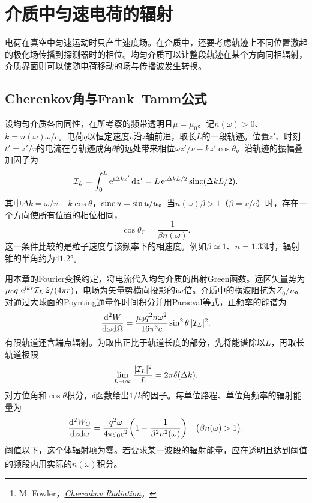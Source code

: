 \section{介质中匀速电荷的辐射}
\label{sec:moving charge in matter}

电荷在真空中匀速运动时只产生速度场。在介质中，还要考虑轨迹上不同位置激起的极化场传播到探测器时的相位。均匀介质可以让整段轨迹在某个方向同相辐射，介质界面则可以使随电荷移动的场与传播波发生转换。

\subsection{Cherenkov角与Frank--Tamm公式}
设均匀介质各向同性，在所考察的频带透明且$\mu = \mu_0$。记$n(\omega) > 0$、$k = n(\omega)\omega/c$。电荷$q$以恒定速度$v$沿$z$轴前进，取长$L$的一段轨迹。位置$z'$、时刻$t' = z'/v$的电流在与轨迹成角$\theta$的远处带来相位$\omega z'/v - kz'\cos\theta$。沿轨迹的振幅叠加因子为
\begin{equation}
    \label{eq:ed-finite-track-interference}
    \mathcal I_L = \int_0^L\mathop{}\!\mathrm{e}^{\mathrm{i}\Delta k z'}\mathop{}\!\mathrm{d} z'
        = L\mathop{}\!\mathrm{e}^{\mathrm{i}\Delta kL/2}\operatorname{sinc}(\Delta kL/2).
\end{equation}
其中$\Delta k = \omega/v - k\cos\theta$，$\operatorname{sinc} u = \sin u/u$。当$n(\omega)\beta > 1$（$\beta = v/c$）时，存在一个方向使所有位置的相位相同，
\begin{equation}
    \cos\theta_\mathrm{C} = \frac{1}{\beta n(\omega)} .
    \label{eqn:Cherenkov angle}
\end{equation}
这一条件比较的是粒子速度与该频率下的相速度。例如$\beta \simeq 1$、$n = 1.33$时，辐射锥的半角约为$\ang{41.2}$。

用本章的Fourier变换约定，将电流代入均匀介质的出射Green函数。远区矢量势为$\mu_0q\,\mathop{}\!\mathrm{e}^{\mathrm{i} kr}\mathcal I_L\mathop{}\!\hat{\bm{z}}/(4\pi r)$，电场为矢量势横向投影的$\mathrm{i}\omega$倍。介质中的横波阻抗为$Z_0/n$。对通过大球面的Poynting通量作时间积分并用Parseval等式，正频率的能谱为
\[
    \frac{\mathop{}\!\mathrm{d}^2W}{\mathrm{d}\omega\mathrm{d}\Omega}
    = \frac{\mu_0 q^2 n\omega^2}{16\pi^3c}
        \sin^2\theta\,\lvert\mathcal I_L\rvert^2 .
\]
有限轨道还含端点辐射。为取出正比于轨道长度的部分，先将能谱除以$L$，再取长轨道极限
\[
    \lim_{L\to\infty}\frac{\lvert\mathcal I_L\rvert^2}{L} = 2\pi\delta(\Delta k).
\]
对方位角和$\cos\theta$积分，$\delta$函数给出$1/k$的因子。每单位路程、单位角频率的辐射能量为
\begin{equation}
    \frac{\mathop{}\!\mathrm{d}^2 W_\mathrm{C}}{\mathrm{d} z\mathrm{d}\omega}
    = \frac{q^2\omega}{4\pi\varepsilon_0 c^2}
       \biggl(1 - \frac{1}{\beta^2 n^2(\omega)}\biggr)\quad\bigl(\beta n(\omega) > 1\bigr).
    \label{eqn:Frank Tamm}
\end{equation}
阈值以下，这个体辐射项为零。若要求某一波段的辐射能量，应在透明且达到阈值的频段内用实际的$n(\omega)$积分。\footnote{M. Fowler，\href{https://galileoandeinstein.phys.virginia.edu/Elec_Mag/2022_Lectures/EM_70_Cherenkov_Radiation.html}{\textit{Cherenkov Radiation}}。}

